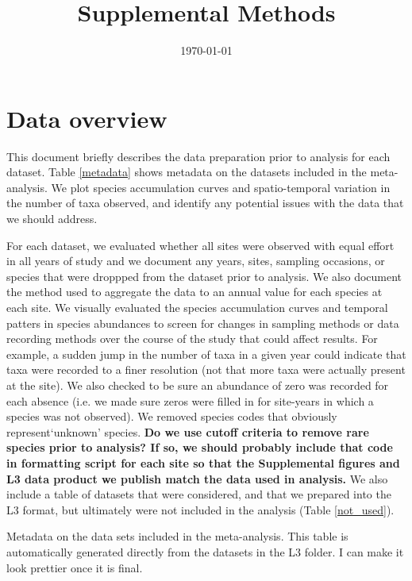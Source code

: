 \documentclass[11pt, oneside]{article}
\title{Supplemental Methods}
\author[1]{}
\author[2]{}
\author[3]{}
\date{\today}
\begin{document}
\maketitle

\doublespacing

\section {Data overview}
This document briefly describes the data preparation prior to analysis for each dataset.
Table \ref{metadata} shows metadata on the datasets included in the meta-analysis.
We plot species accumulation curves and spatio-temporal variation in the number of taxa observed, and identify any potential issues with the data that we should address.

For each dataset, we evaluated whether all sites were observed with equal effort in all years of study and we document any years, sites, sampling occasions,  or species that were droppped from the dataset prior to analysis. 
We also document the method used to aggregate the data to an annual value for each species at each site.
We visually evaluated the species accumulation curves and temporal patters in species abundances to screen for changes in sampling methods or data recording methods over the course of the study that could affect results.
For example, a sudden jump in the number of taxa in a given year could indicate that taxa were recorded to a finer resolution (not that more taxa were actually present at the site).  
We also checked to be sure an abundance of zero was recorded for each absence (i.e. we made sure zeros were filled in for site-years in which a species was not observed).
We removed species codes that obviously represent`unknown' species.
{\bf Do we use cutoff criteria to remove rare species prior to analysis? 
If so, we  should probably include that code in formatting script for each site so that the Supplemental figures and L3 data product we publish match the data used in analysis.}
We also include a table of datasets that were considered, and that we prepared into the L3 format, but ultimately were not included in the analysis (Table \ref{not_used}).


\begin{table}[h!]
\scriptsize
   \centering
     \caption{Metadata on the data sets included in the meta-analysis. This table is automatically generated directly from the datasets in the L3 folder. I can make it look prettier once it is final.} 

   \label{metadata} 
\end{table}
\end{document}
